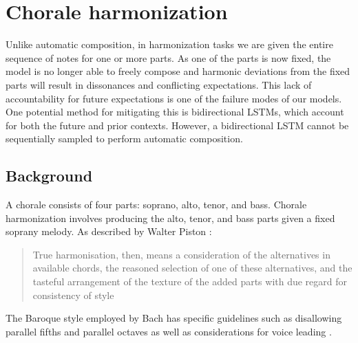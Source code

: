 \chapter{Chorale harmonization}

\ifpdf
    \graphicspath{{Chapter5/Figs/Raster/}{Chapter5/Figs/PDF/}{Chapter5/Figs/}}
\else
    \graphicspath{{Chapter5/Figs/Vector/}{Chapter5/Figs/}}
\fi


Unlike automatic composition, in harmonization tasks we are given the entire sequence of notes
for one or more parts. As one of the parts is now fixed, the model is no longer able to freely
compose and harmonic deviations from the fixed parts will result in dissonances and conflicting
expectations. This lack of accountability for future expectations is one of the failure modes of our models.
One potential method for mitigating this is bidirectional LSTMs\citep{Graves2005}, which account
for both the future and prior contexts. However, a bidirectional LSTM cannot be sequentially
sampled to perform automatic composition.

\section{Background}

A chorale consists of four parts: soprano, alto, tenor, and bass. Chorale harmonization
involves producing the alto, tenor, and bass parts given a fixed soprany melody. As described
by Walter Piston \citep{piston1978harmony}:

\begin{quote}
  True harmonisation, then, means a consideration of the alternatives in available chords, the reasoned selection of one
  of these alternatives, and the tasteful arrangement of the texture of the added parts with due regard
  for consistency of style
\end{quote}

The Baroque style employed by Bach has specific guidelines
such as disallowing parallel fifths and parallel octaves as well as
considerations for voice leading \citep{piston1978harmony}.

